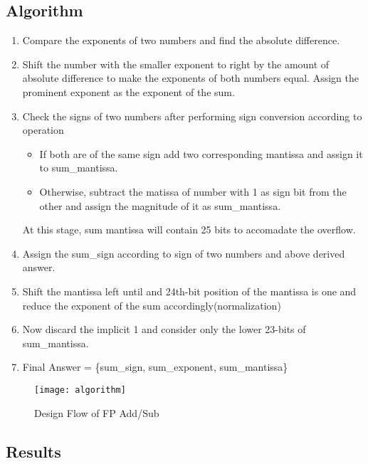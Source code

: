 \documentclass[11pt]{article}
\begin{document}
    \subsection{Algorithm}
    \begin{enumerate}
        \item Compare the exponents of two numbers and find the absolute difference.
        \item Shift the number with the smaller exponent to right by the amount of absolute difference to make the exponents of both numbers equal. Assign the prominent exponent as the exponent of the sum.
        \item Check the signs of two numbers after performing sign conversion according to operation
        \begin{itemize}
            \item If both are of the same sign add two corresponding mantissa and assign it to sum\_mantissa.
            \item Otherwise, subtract the matissa of number with 1 as sign bit from the other and assign the magnitude of it as sum\_mantissa.
        \end{itemize}
        \hspace*{\dimexpr\linewidth-\textwidth\relax} At this stage, sum mantissa will contain 25 bits to accomadate the overflow.
        \item Assign the sum\_sign according to sign of two numbers and above derived answer.
        \item Shift the mantissa left until and 24th-bit position of the mantissa is one and reduce the exponent of the sum accordingly(normalization)
        \item Now discard the implicit 1 and consider only the lower 23-bits of sum\_mantissa.
        \item Final Answer = \{sum\_sign, sum\_exponent, sum\_mantissa\}
    \end{enumerate}
    \begin{figure}[h]
        \begin{center}
            \texttt{[image: algorithm]}
            \caption*{Design Flow of FP Add/Sub}
        \end{center}
    \end{figure}

    \subsection{Results}
\end{document}
